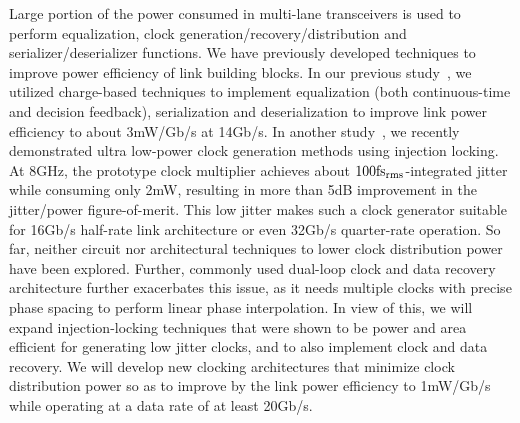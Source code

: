 Large portion of the power consumed in multi-lane transceivers is used to perform equalization, clock generation/recovery/distribution and serializer/deserializer functions. 
We have previously developed techniques to improve power efficiency of link building blocks.
In our previous study~\cite{saxena20152}, we utilized charge-based techniques to implement equalization (both continuous-time and decision feedback), serialization and deserialization to improve link power efficiency to about 3mW/Gb/s at 14Gb/s. 
In another study~\cite{elkholy201610}, we recently demonstrated ultra low-power clock generation methods using injection locking. 
At 8GHz, the prototype clock multiplier achieves about $\rm 100 fs_{rms}$-integrated jitter while consuming only 2mW, resulting in more than 5dB improvement in the jitter/power figure-of-merit. 
This low jitter makes such a clock generator suitable for 16Gb/s half-rate link architecture or even 32Gb/s quarter-rate operation. 
So far, neither circuit nor architectural techniques to lower clock distribution power have been explored. 
Further, commonly used dual-loop clock and data recovery  architecture further exacerbates this issue, as it needs multiple clocks with precise phase spacing to perform linear phase interpolation. 
In view of this, we will expand injection-locking techniques that were shown to be power and area efficient for generating low jitter clocks, and to also implement clock and data recovery. 
We will develop new clocking architectures that minimize clock distribution power so as to improve by the link power efficiency to 1mW/Gb/s while operating at a data rate of at least 20Gb/s.

